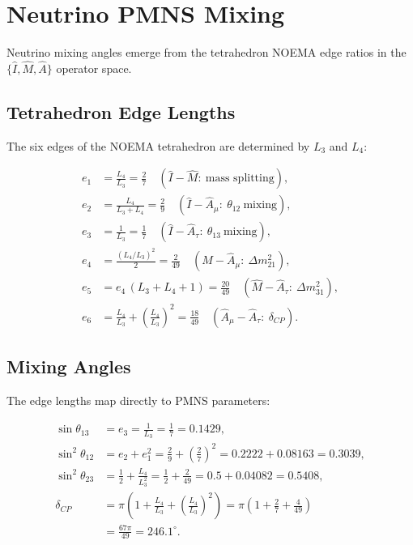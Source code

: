 \chapter{Neutrino PMNS Mixing}
\label{ch:pmns_mixing}

Neutrino mixing angles emerge from the tetrahedron NOEMA edge ratios in the
\(\{\hat I, \hat M, \hat A\}\) operator space.

\section{Tetrahedron Edge Lengths}

The six edges of the NOEMA tetrahedron are determined by \(L_3\) and
\(L_4\):

\[
\begin{aligned}
e_1 &= \frac{L_4}{L_3} = \frac{2}{7}
     \quad (\hat I-\hat M:\ \text{mass splitting}), \\[4pt]
e_2 &= \frac{L_4}{L_3+L_4} = \frac{2}{9}
     \quad (\hat I-\hat A_\mu:\ \theta_{12}\ \text{mixing}), \\[4pt]
e_3 &= \frac{1}{L_3} = \frac{1}{7}
     \quad (\hat I-\hat A_\tau:\ \theta_{13}\ \text{mixing}), \\[4pt]
e_4 &= \frac{(L_4/L_3)^2}{2} = \frac{2}{49}
     \quad (\hat M-\hat A_\mu:\ \Delta m_{21}^2), \\[4pt]
e_5 &= e_4\,(L_3+L_4+1) = \frac{20}{49}
     \quad (\hat M-\hat A_\tau:\ \Delta m_{31}^2), \\[4pt]
e_6 &= \frac{L_4}{L_3} + \left(\frac{L_4}{L_3}\right)^2 = \frac{18}{49}
     \quad (\hat A_\mu-\hat A_\tau:\ \delta_{CP}).
\end{aligned}
\]

\section{Mixing Angles}

The edge lengths map directly to PMNS parameters:

\[
\begin{aligned}
\sin\theta_{13} &= e_3 = \frac{1}{L_3} = \frac{1}{7} = 0.1429, \\[4pt]
\sin^2\theta_{12} &= e_2 + e_1^2
    = \frac{2}{9} + \left(\frac{2}{7}\right)^2
    = 0.2222 + 0.08163
    = 0.3039, \\[4pt]
\sin^2\theta_{23} &= \frac12 + \frac{L_4}{L_3^2}
    = \frac12 + \frac{2}{49}
    = 0.5 + 0.04082
    = 0.5408, \\[4pt]
\delta_{CP} &= \pi\left(1 + \frac{L_4}{L_3} + \left(\frac{L_4}{L_3}\right)^2\right)
    = \pi\left(1 + \frac{2}{7} + \frac{4}{49}\right) \\[4pt]
    &= \frac{67\pi}{49}
    = 246.1^\circ.
\end{aligned}
\]

